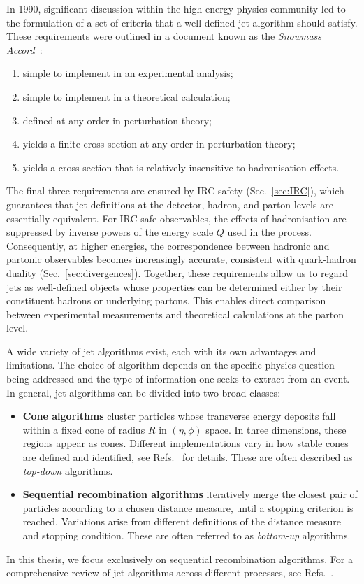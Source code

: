 In 1990, significant discussion within the high-energy physics community 
led to the formulation of a set of criteria that a well-defined jet 
algorithm should satisfy. These requirements were outlined in a document 
known as the \emph{Snowmass Accord}~\cite{Huth:1990mi}:
\begin{enumerate}
    \item simple to implement in an experimental analysis;
    \item simple to implement in a theoretical calculation;
    \item defined at any order in perturbation theory;
    \item yields a finite cross section at any order in perturbation theory;
    \item yields a cross section that is relatively insensitive to hadronisation effects.
\end{enumerate}
The final three requirements are ensured by IRC safety 
(Sec.~\ref{sec:IRC}), which guarantees that jet definitions at the 
detector, hadron, and parton levels are essentially equivalent.
For IRC-safe observables, the effects of hadronisation are suppressed by inverse powers of the energy scale $Q$ used in the process. Consequently, at higher energies, the correspondence between hadronic and partonic observables becomes increasingly accurate, consistent with quark-hadron duality (Sec.~\ref{sec:divergences}). Together, these requirements allow us to regard jets as well-defined objects whose properties can be determined either by their constituent hadrons or underlying partons. This enables direct comparison between experimental measurements and theoretical calculations at the parton level.

A wide variety of jet algorithms exist, each with its own advantages and limitations. The choice of algorithm depends on the specific physics question being addressed and the type of information one seeks to extract from an event. In general, jet algorithms can be divided into two broad classes:
\begin{itemize}
\item \textbf{Cone algorithms} cluster particles whose transverse
energy deposits fall within a fixed cone of radius $R$ in $(\eta,\phi)$ space. 
In three dimensions, these regions appear as cones. Different implementations vary in how stable 
cones are defined and identified, see Refs.~\cite{Salam:2007xv,Kidonakis:1998bk} 
for details. These are often described as \emph{top-down} algorithms.

    \item \textbf{Sequential recombination algorithms} iteratively merge the closest pair of particles according to a chosen distance measure, until a stopping criterion is reached. Variations arise from different definitions of the distance measure and stopping condition. These are often referred to as \emph{bottom-up} algorithms.
\end{itemize}
In this thesis, we focus exclusively on sequential recombination algorithms. For a comprehensive review of jet algorithms across different processes, see Refs.~\cite{Banfi:2016yyq, Salam:2010nqg}.

